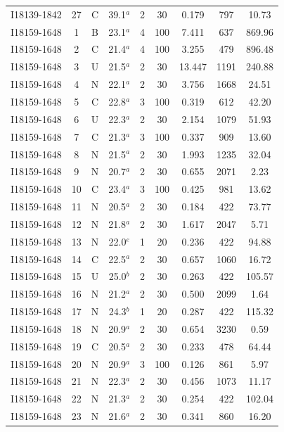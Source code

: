 \begin{table}
\begin{tabular}{ccccccccc}
I18139-1842 & 27 & C & 39.1$^{a}$ & 2 & 30 & 0.179 & 797 & 10.73 \\
I18159-1648 & 1 & B & 23.1$^{a}$ & 4 & 100 & 7.411 & 637 & 869.96 \\
I18159-1648 & 2 & C & 21.4$^{a}$ & 4 & 100 & 3.255 & 479 & 896.48 \\
I18159-1648 & 3 & U & 21.5$^{a}$ & 2 & 30 & 13.447 & 1191 & 240.88 \\
I18159-1648 & 4 & N & 22.1$^{a}$ & 2 & 30 & 3.756 & 1668 & 24.51 \\
I18159-1648 & 5 & C & 22.8$^{a}$ & 3 & 100 & 0.319 & 612 & 42.20 \\
I18159-1648 & 6 & U & 22.3$^{a}$ & 2 & 30 & 2.154 & 1079 & 51.93 \\
I18159-1648 & 7 & C & 21.3$^{a}$ & 3 & 100 & 0.337 & 909 & 13.60 \\
I18159-1648 & 8 & N & 21.5$^{a}$ & 2 & 30 & 1.993 & 1235 & 32.04 \\
I18159-1648 & 9 & N & 20.7$^{a}$ & 2 & 30 & 0.655 & 2071 & 2.23 \\
I18159-1648 & 10 & C & 23.4$^{a}$ & 3 & 100 & 0.425 & 981 & 13.62 \\
I18159-1648 & 11 & N & 20.5$^{a}$ & 2 & 30 & 0.184 & 422 & 73.77 \\
I18159-1648 & 12 & N & 21.8$^{a}$ & 2 & 30 & 1.617 & 2047 & 5.71 \\
I18159-1648 & 13 & N & 22.0$^{e}$ & 1 & 20 & 0.236 & 422 & 94.88 \\
I18159-1648 & 14 & C & 22.5$^{a}$ & 2 & 30 & 0.657 & 1060 & 16.72 \\
I18159-1648 & 15 & U & 25.0$^{b}$ & 2 & 30 & 0.263 & 422 & 105.57 \\
I18159-1648 & 16 & N & 21.2$^{a}$ & 2 & 30 & 0.500 & 2099 & 1.64 \\
I18159-1648 & 17 & N & 24.3$^{b}$ & 1 & 20 & 0.287 & 422 & 115.32 \\
I18159-1648 & 18 & N & 20.9$^{a}$ & 2 & 30 & 0.654 & 3230 & 0.59 \\
I18159-1648 & 19 & C & 20.5$^{a}$ & 2 & 30 & 0.233 & 478 & 64.44 \\
I18159-1648 & 20 & N & 20.9$^{a}$ & 3 & 100 & 0.126 & 861 & 5.97 \\
I18159-1648 & 21 & N & 22.3$^{a}$ & 2 & 30 & 0.456 & 1073 & 11.17 \\
I18159-1648 & 22 & N & 21.3$^{a}$ & 2 & 30 & 0.254 & 422 & 102.04 \\
I18159-1648 & 23 & N & 21.6$^{a}$ & 2 & 30 & 0.341 & 860 & 16.20 \\

\end{tabular}
\end{table}
